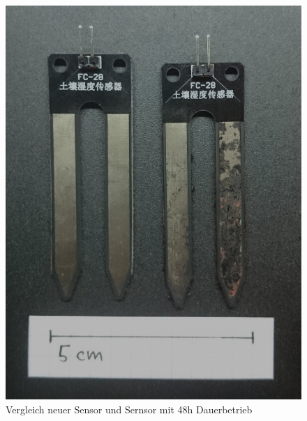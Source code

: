 \begin{figure}[!h]
	\centering
	\includegraphics[width=0.9\linewidth]{bilder/_fechtesensorVergleich0.jpg}
	\caption{Vergleich neuer Sensor und Sernsor mit 48h Dauerbetrieb}
	\label{fig-SensorVergleich}
\end{figure}


